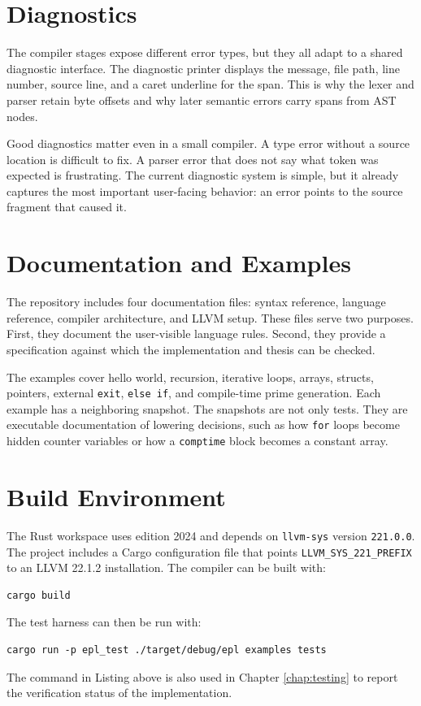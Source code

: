 \section{Diagnostics}

The compiler stages expose different error types, but they all adapt to a shared
diagnostic interface. The diagnostic printer displays the message, file path,
line number, source line, and a caret underline for the span. This is why the
lexer and parser retain byte offsets and why later semantic errors carry spans
from AST nodes.

Good diagnostics matter even in a small compiler. A type error without a source
location is difficult to fix. A parser error that does not say what token was
expected is frustrating. The current diagnostic system is simple, but it already
captures the most important user-facing behavior: an error points to the source
fragment that caused it.

\section{Documentation and Examples}

The repository includes four documentation files: syntax reference, language
reference, compiler architecture, and LLVM setup. These files serve two
purposes. First, they document the user-visible language rules. Second, they
provide a specification against which the implementation and thesis can be
checked.

The examples cover hello world, recursion, iterative loops, arrays, structs,
pointers, external \texttt{exit}, \texttt{else if}, and compile-time prime
generation. Each example has a neighboring \irtree{} snapshot. The snapshots
are not only tests. They are executable documentation of lowering decisions,
such as how \texttt{for} loops become hidden counter variables or how a
\texttt{comptime} block becomes a constant array.

\section{Build Environment}

The Rust workspace uses edition 2024 and depends on \texttt{llvm-sys} version
\texttt{221.0.0}. The project includes a Cargo configuration file that points
\texttt{LLVM\_SYS\_221\_PREFIX} to an LLVM 22.1.2 installation. The compiler can
be built with:

\begin{lstlisting}[caption={Building the compiler}]
cargo build
\end{lstlisting}

The test harness can then be run with:

\begin{lstlisting}[caption={Running the EPL test harness}]
cargo run -p epl_test ./target/debug/epl examples tests
\end{lstlisting}

The command in Listing above is also used in Chapter \ref{chap:testing} to
report the verification status of the implementation.
